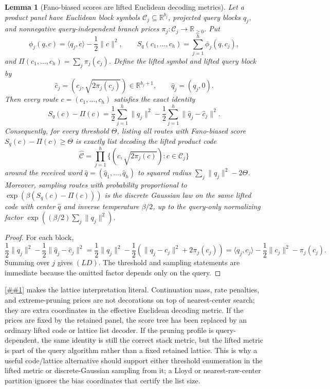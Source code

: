 \documentclass[10pt]{article}
\newcommand{\Cref}[1]{\ref{##1}}
\newtheorem{lemma}[theorem]{Lemma}
\theoremstyle{definition}
\newcommand{\ip}[2]{\langle #1,#2\rangle}
\begin{document}
\begin{lemma}[Fano-biased scores are lifted Euclidean decoding metrics]
   \label{lem:fano-lifted-euclidean-decoding}
   Let a product panel have Euclidean block symbols
   \(\mathcal C_j\subseteq\mathbb R^{b_j}\), projected query blocks \(q_j\),
   and nonnegative query-independent branch prices
   \(\pi_j:\mathcal C_j\to\mathbb R_{\ge0}\).  Put
   \[
      \phi_j(q,c)=\ip{q_j}{c}-\frac12\|c\|^2,\qquad
      S_q(c_1,\ldots,c_h)=\sum_{j=1}^h\phi_j(q,c_j),
   \]
   and \(\Pi(c_1,\ldots,c_h)=\sum_j\pi_j(c_j)\).  Define the lifted symbol
   and lifted query block by
   \[
      \widehat c_j=(c_j,\sqrt{2\pi_j(c_j)})\in\mathbb R^{b_j+1},
      \qquad
      \widehat q_j=(q_j,0).
   \]
   Then every route \(c=(c_1,\ldots,c_h)\) satisfies the exact identity
   \[
      S_q(c)-\Pi(c)
      =
      \frac12\sum_{j=1}^h\|q_j\|^2
      -
      \frac12\sum_{j=1}^h\|\widehat q_j-\widehat c_j\|^2.
      \tag{LD}
   \]
   Consequently, for every threshold \(\Theta\), listing all routes with
   Fano-biased score \(S_q(c)-\Pi(c)\ge\Theta\) is exactly list decoding the
   lifted product code
   \[
      \widehat{\mathcal C}
      =
      \prod_{j=1}^h
      \{(c,\sqrt{2\pi_j(c)}):c\in\mathcal C_j\}
   \]
   around the received word \(\widehat q=(\widehat q_1,\ldots,\widehat q_h)\)
   to squared radius \(\sum_j\|q_j\|^2-2\Theta\).  Moreover, sampling routes
   with probability proportional to
   \(\exp(\beta(S_q(c)-\Pi(c)))\) is the discrete Gaussian law on the same
   lifted code with center \(\widehat q\) and inverse temperature \(\beta/2\),
   up to the query-only normalizing factor
   \(\exp((\beta/2)\sum_j\|q_j\|^2)\).
\end{lemma}

\begin{proof}
   For each block,
   \[
      \frac12\|q_j\|^2-\frac12\|\widehat q_j-\widehat c_j\|^2
      =
      \frac12\|q_j\|^2
      -
      \frac12\left(\|q_j-c_j\|^2+2\pi_j(c_j)\right)
      =
      \ip{q_j}{c_j}-\frac12\|c_j\|^2-\pi_j(c_j).
   \]
   Summing over \(j\) gives \((LD)\).  The threshold and sampling statements
   are immediate because the omitted factor depends only on the query.
\end{proof}

\Cref{lem:fano-lifted-euclidean-decoding} makes the lattice interpretation
literal.  Continuation mass, rate penalties, and extreme-pruning prices are not
decorations on top of nearest-center search; they are extra coordinates in the
effective Euclidean decoding metric.  If the prices are fixed by the retained
panel, the score tree has been replaced by an ordinary lifted code or lattice
list decoder.  If the pruning profile is query-dependent, the same identity is
still the correct stack metric, but the lifted metric is part of the query
algorithm rather than a fixed retained lattice.  This is why a useful
code/lattice alternative should support either threshold enumeration in the
lifted metric or discrete-Gaussian sampling from it; a Lloyd or nearest-raw-center
partition ignores the bias coordinates that certify the list size.
\end{document}
